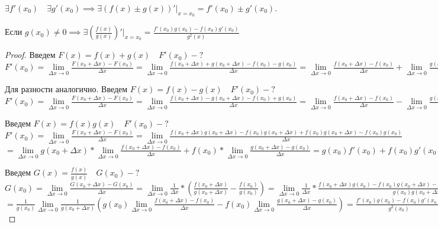 \documentclass[../main.tex]{subfiles}
\begin{document}
\begin{theorem}
    $\exists f'(x_{0})\quad \exists g'(x_{0})\implies \exists (f(x)\pm g(x))'\bigg|_{x=x_{0}}=f'(x_{0})\pm g'(x_{0}).$

    Если $g(x_{0})\neq 0 \implies \exists (\frac{f(x)}{g(x)})'\bigg|_{x=x_{0}}=\frac{f'(x_{0})g(x_{0})-f(x_{0})g'(x_{0})}{g^{2}(x)}$
\end{theorem}
\begin{proof}
    Введем $F(x)=f(x)+g(x)\quad F'(x_{0})-?$\\
    $F'(x_{0})=\lim\limits_{\Delta x\to 0} \frac{F(x_{0}+\Delta x)-F(x_{0})}{\Delta x}=\lim\limits_{\Delta x\to 0} \frac{f(x_{0}+\Delta x)+g(x_{0}+\Delta x)-f(x_{0})-g(x_{0})}{\Delta x}=\lim\limits_{\Delta x\to 0} \frac{f(x_{0}+\Delta x)-f(x_{0})}{\Delta x} + \lim\limits_{\Delta x\to 0} \frac{g(x_{0}+\Delta x)-g(x_{0})}{\Delta x}=f'(x_{0}) +g'(x_{0}).$
    
    Для разности аналогично. Введем $F(x)=f(x)-g(x) \quad F'(x_{0})-?$\\ 
     $F'(x_{0})=\lim\limits_{\Delta x\to 0} \frac{F(x_{0}+\Delta x)-F(x_{0})}{\Delta x}=\lim\limits_{\Delta x\to 0} \frac{f(x_{0}+\Delta x)-g(x_{0}+\Delta x)-f(x_{0})+g(x_{0})}{\Delta x}=\lim\limits_{\Delta x\to 0} \frac{f(x_{0}+\Delta x)-f(x_{0})}{\Delta x} - \lim\limits_{\Delta x\to 0} \frac{g(x_{0}+\Delta x)-g(x_{0})}{\Delta x}=f'(x_{0}) -g'(x_{0}).$

     Введем $F(x)=f(x)g(x) \quad F'(x_{0})-?$\\
     $F'(x_{0})=\lim\limits_{\Delta x\to 0} \frac{F(x_{0}+\Delta x)-F(x_{0})}{\Delta x}=\lim\limits_{\Delta x\to 0} \frac{f(x_{0}+\Delta x)g(x_{0}+\Delta x)-f(x_{0})g(x_{0}+\Delta x)+f(x_{0})g(x_{0}+\Delta x)-f(x_{0})g(x_{0})}{\Delta x}$\\
     $=\lim\limits_{\Delta x\to 0}g(x_{0}+\Delta x)*\lim\limits_{\Delta x\to 0} \frac{f(x_{0}+\Delta x)-f(x_{0})}{\Delta x}+ f(x_{0})*\lim\limits_{\Delta x\to 0} \frac{g(x_{0}+\Delta x)-g(x_{0})}{\Delta x}= g(x_{0})f'(x_{0})+f(x_{0})g'(x_{0}).$

     Введем $G(x)=\frac{f(x)}{g(x)}\quad G(x_{0})-?$\\
     $G(x_{0})=\lim\limits_{\Delta x\to 0}\frac{G(x_{0}+\Delta x)-G(x_{0})}{\Delta x}=\lim\limits_{\Delta x\to 0} \frac{1}{\Delta x}*\left(\frac{f(x_{0}+\Delta x)}{g(x_{0}+\Delta x)}-\frac{f(x_{0})}{g(x_{0})} \right)=\lim\limits_{\Delta x\to 0} \frac{1}{\Delta x}* \frac{f(x_{0}+\Delta x)g(x_{0})-f(x_{0})g(x_{0}+\Delta x)-f(x_{0})g(x_{0})+f(x_{0})g(x_{0})}{g(x_{0})g(x_{0}+\Delta x)}=$\\ 
     $=\frac{1}{g(x_{0})}\lim\limits_{\Delta x\to 0}\frac{1}{g(x_{0}+\Delta x)}\left(g(x_{0})\lim\limits_{\Delta x\to 0}\frac{f(x_{0}+\Delta x )-f(x_{0})}{\Delta x}-f(x_{0})\lim\limits_{\Delta x\to 0} \frac{g(x_{0}+\Delta x)-g(x_{0})}{\Delta x}\right)=\frac{f'(x_{0})g(x_{0})-f(x_{0})g'(x_{0})}{g^{2}(x_{0})}    $
\end{proof}
\end{document}
